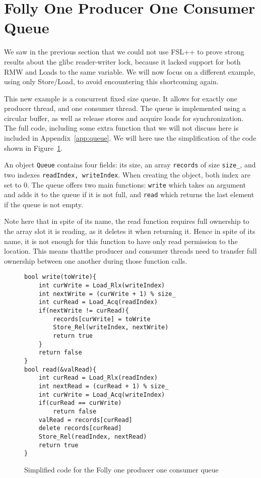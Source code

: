 \section{Folly One Producer One Consumer Queue}

We saw in the previous section that we could not use FSL++ to prove strong results about the glibc reader-writer lock, because it lacked support for both RMW and Loads to the same variable. We will now focus on a different example, using only Store/Load, to avoid encountering this shortcoming again.

This new example is a concurrent fixed size queue. It allows for exactly one producer thread, and one consumer thread. The queue is implemented using a circular buffer, as well as release stores and acquire loads for synchronization. The full code, including some extra function that we will not discuss here is included in Appendix~\ref{app:queue}. We will here use the simplification of the code shown in Figure~\ref{fig:queueCyclic}.

An object \texttt{Queue} contains four fields: its size, an array \texttt{records} of size \texttt{size\_}, and two indexes \texttt{readIndex, writeIndex}. When creating the object, both index are set to $0$. The queue offers two main functions: \texttt{write} which takes an argument and adds it to the queue if it is not full, and \texttt{read} which returns the last element if the queue is not empty. 

Note here that in spite of its name, the read function requires full ownership to the array slot it is reading, as it deletes it when returning it. Hence in spite of its name, it is not enough for this function to have only read permission to the location. This means thatthe producer and consumer threads need to transfer full ownership between one another during those function calls.

\begin{figure}
\begin{lstlisting}
bool write(toWrite){
	int curWrite = Load_Rlx(writeIndex)
	int nextWrite = (curWrite + 1) % size_
	int curRead = Load_Acq(readIndex)
	if(nextWrite != curRead){
		records[curWrite] = toWrite
		Store_Rel(writeIndex, nextWrite)
		return true
	}
	return false
}
bool read(&valRead){
	int curRead = Load_Rlx(readIndex)
	int nextRead = (curRead + 1) % size_
	int curWrite = Load_Acq(writeIndex)
	if(curRead == curWrite)
		return false
	valRead = records[curRead]
	delete records[curRead]
	Store_Rel(readIndex, nextRead)
	return true
}

\end{lstlisting}
		\caption{Simplified code for the Folly one producer one consumer queue}
		\label{fig:queueCyclic}
\end{figure}

